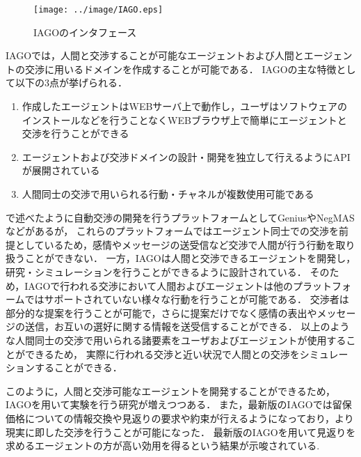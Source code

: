 \begin{figure}[tb]
    \centering
    \texttt{[image: ../image/IAGO.eps]}
    \caption{IAGOのインタフェース}
    \label{fig:iago}
\end{figure}

IAGOでは，人間と交渉することが可能なエージェントおよび人間とエージェントの交渉に用いるドメインを作成することが可能である．
IAGOの主な特徴として以下の3点が挙げられる\cite{pinocchio}．

\begin{enumerate}
    \item 作成したエージェントはWEBサーバ上で動作し，ユーザはソフトウェアのインストールなどを行うことなくWEBブラウザ上で簡単にエージェントと交渉を行うことができる
    \item エージェントおよび交渉ドメインの設計・開発を独立して行えるようにAPIが展開されている
    \item 人間同士の交渉で用いられる行動・チャネルが複数使用可能である
\end{enumerate}

で述べたように自動交渉の開発を行うプラットフォームとしてGenius\cite{genius}やNegMAS\cite{negmas}などがあるが，
これらのプラットフォームではエージェント同士での交渉を前提としているため，感情やメッセージの送受信など交渉で人間が行う行動を取り扱うことができない．
一方，IAGOは人間と交渉できるエージェントを開発し，研究・シミュレーションを行うことができるように設計されている．
そのため，IAGOで行われる交渉において人間およびエージェントは他のプラットフォームではサポートされていない様々な行動を行うことが可能である．
交渉者は部分的な提案を行うことが可能で，さらに提案だけでなく感情の表出やメッセージの送信，お互いの選好に関する情報を送受信することができる．
以上のような人間同士の交渉で用いられる諸要素をユーザおよびエージェントが使用することができるため，
実際に行われる交渉と近い状況で人間との交渉をシミュレーションすることができる．

このように，人間と交渉可能なエージェントを開発することができるため，IAGOを用いて実験を行う研究が増えつつある．
また，最新版のIAGOでは留保価格についての情報交換や見返りの要求や約束が行えるようになっており，より現実に即した交渉を行うことが可能になった．
最新版のIAGOを用いて見返りを求めるエージェントの方が高い効用を得るという結果が示唆されている\cite{favor}.


